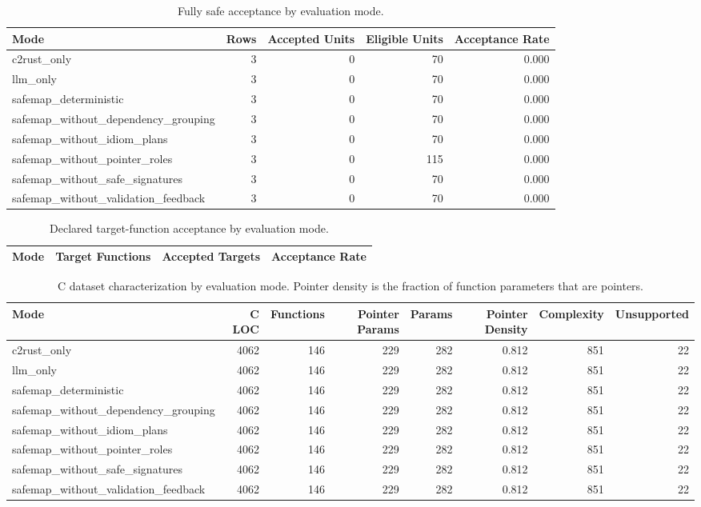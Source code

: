 \begin{table}[t]
\centering
\caption{Fully safe acceptance by evaluation mode.}
\label{tab:safemap-mode-summary}
\begin{tabular}{lrrrr}
\hline
Mode & Rows & Accepted Units & Eligible Units & Acceptance Rate \\
\hline
c2rust\_only & 3 & 0 & 70 & 0.000 \\
llm\_only & 3 & 0 & 70 & 0.000 \\
safemap\_deterministic & 3 & 0 & 70 & 0.000 \\
safemap\_without\_dependency\_grouping & 3 & 0 & 70 & 0.000 \\
safemap\_without\_idiom\_plans & 3 & 0 & 70 & 0.000 \\
safemap\_without\_pointer\_roles & 3 & 0 & 115 & 0.000 \\
safemap\_without\_safe\_signatures & 3 & 0 & 70 & 0.000 \\
safemap\_without\_validation\_feedback & 3 & 0 & 70 & 0.000 \\
\hline
\end{tabular}
\end{table}

\begin{table}[t]
\centering
\caption{Declared target-function acceptance by evaluation mode.}
\label{tab:safemap-target-summary}
\begin{tabular}{lrrr}
\hline
Mode & Target Functions & Accepted Targets & Acceptance Rate \\
\hline
\hline
\end{tabular}
\end{table}

\begin{table}[t]
\centering
\caption{C dataset characterization by evaluation mode. Pointer density is the fraction of function parameters that are pointers.}
\label{tab:safemap-dataset-characterization}
\begin{tabular}{lrrrrrrr}
\hline
Mode & C LOC & Functions & Pointer Params & Params & Pointer Density & Complexity & Unsupported \\
\hline
c2rust\_only & 4062 & 146 & 229 & 282 & 0.812 & 851 & 22 \\
llm\_only & 4062 & 146 & 229 & 282 & 0.812 & 851 & 22 \\
safemap\_deterministic & 4062 & 146 & 229 & 282 & 0.812 & 851 & 22 \\
safemap\_without\_dependency\_grouping & 4062 & 146 & 229 & 282 & 0.812 & 851 & 22 \\
safemap\_without\_idiom\_plans & 4062 & 146 & 229 & 282 & 0.812 & 851 & 22 \\
safemap\_without\_pointer\_roles & 4062 & 146 & 229 & 282 & 0.812 & 851 & 22 \\
safemap\_without\_safe\_signatures & 4062 & 146 & 229 & 282 & 0.812 & 851 & 22 \\
safemap\_without\_validation\_feedback & 4062 & 146 & 229 & 282 & 0.812 & 851 & 22 \\
\hline
\end{tabular}
\end{table}

